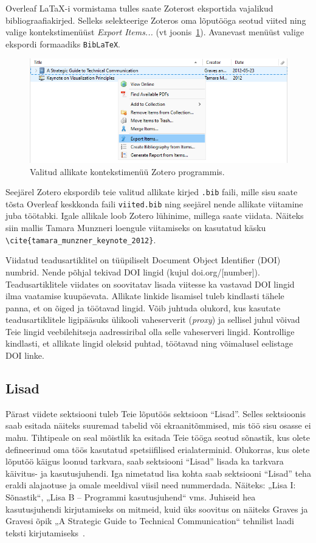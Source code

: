 Overleaf LaTaX-i vormistama tulles saate Zoterost eksportida vajalikud bibliograafiakirjed. Selleks selekteerige Zoteros oma lõputööga seotud viited ning valige kontekstimenüüst \emph{Export Items...} (vt joonis~\ref{fig:zoteroKontekst}). Avanevast menüüst valige ekspordi formaadiks \verb|BibLaTeX|.

\begin{figure}[ht]
    \centering
    \includegraphics[width=\textwidth]{figures/Joonis3-ZoteroBibliograafiaEksport.png}
    \caption{Valitud allikate kontekstimenüü Zotero programmis.}
    \label{fig:zoteroKontekst}
\end{figure}

Seejärel Zotero ekspordib teie valitud allikate kirjed \verb|.bib| faili, mille sisu saate tõsta Overleaf keskkonda faili \verb|viited.bib| ning seejärel nende allikate viitamine juba töötabki. Igale allikale loob Zotero lühinime, millega saate viidata. Näiteks siin mallis Tamara Munzneri loengule viitamiseks on kasutatud käsku \verb|\cite{tamara_munzner_keynote_2012}|.

Viidatud teadusartiklitel on tüüpiliselt Document Object Identifier (DOI) numbrid. Nende põhjal tekivad DOI lingid  (kujul doi.org/[number]). Teadusartiklitele viidates on soovitatav lisada viitesse ka vastavad DOI lingid ilma vaatamise kuupäevata. Allikate linkide lisamisel tuleb kindlasti tähele panna, et on õiged ja töötavad lingid. Võib juhtuda olukord, kus kasutate teadusartiklitele ligipääsuks ülikooli vaheserverit (\emph{proxy}) ja sellisel juhul võivad Teie lingid veebilehitseja aadressiribal olla selle vaheserveri lingid. Kontrollige kindlasti, et allikate lingid oleksid puhtad, töötavad ning võimalusel eelistage DOI linke.

\subsection{Lisad}
Pärast viidete sektsiooni tuleb Teie lõputöös sektsioon “Lisad”. Selles sektsioonis saab esitada näiteks suuremad tabelid või ekraanitõmmised, mis töö sisu osasse ei mahu. Tihtipeale on seal mõistlik ka esitada Teie tööga seotud sõnastik, kus olete defineerinud oma töös kasutatud spetsiifilised erialaterminid. Olukorras, kus olete lõputöö käigus loonud tarkvara, saab sektsiooni “Lisad” lisada ka tarkvara käivitus- ja kasutusjuhendi. Iga nimetatud lisa kohta saab sektsiooni “Lisad” teha eraldi alajaotuse ja omale meeldival viisil need nummerdada. Näiteks: „Lisa I: Sõnastik“, „Lisa B – Programmi kasutusjuhend“ vms. Juhiseid hea kasutusjuhendi kirjutamiseks on mitmeid, kuid üks soovitus on näiteks Graves ja Gravesi õpik „A Strategic Guide to Technical Communication“ tehnilist laadi teksti kirjutamiseks~\cite{graves_strategic_2012}.

